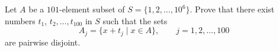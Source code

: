 Let $A$ be a $101$-element subset of $S=\{1,2,\dots,10^6\}$.
Prove that there exist numbers $t_1$, $t_2, \dots, t_{100}$ in $S$ such that the sets
\[ A_j=\{x+t_j\mid x\in A\},\qquad j=1,2,\dots,100  \]
are pairwise disjoint.